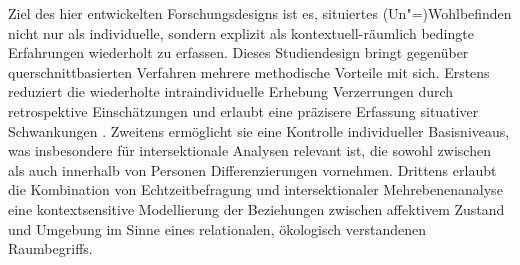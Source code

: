 Ziel des hier entwickelten Forschungsdesigns ist es, situiertes (Un\nobreakdash"=)Wohlbefinden nicht nur als individuelle, sondern explizit als kontextuell-räumlich bedingte Erfahrungen wiederholt zu erfassen. Dieses Studiendesign bringt gegenüber querschnittbasierten Verfahren mehrere methodische Vorteile mit sich. Erstens reduziert die wiederholte intraindividuelle Erhebung Verzerrungen durch retrospektive Einschätzungen und erlaubt eine präzisere Erfassung situativer Schwankungen \parencite{randallDevelopmentTrialMobile2013}. Zweitens ermöglicht sie eine Kontrolle individueller Basisniveaus, was insbesondere für intersektionale Analysen relevant ist, die sowohl zwischen als auch innerhalb von Personen Differenzierungen vornehmen. Drittens erlaubt die Kombination von Echtzeitbefragung und intersektionaler Mehrebenenanalyse eine kontextsensitive Modellierung der Beziehungen zwischen affektivem Zustand und Umgebung im Sinne eines relationalen, ökologisch verstandenen Raumbegriffs.
